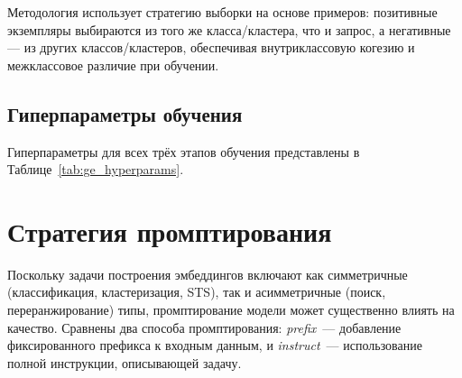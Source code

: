 Методология использует стратегию выборки на основе примеров: позитивные экземпляры выбираются из того же класса/кластера, что и запрос, а негативные --- из других классов/кластеров, обеспечивая внутриклассовую когезию и межклассовое различие при обучении.

\subsection{Гиперпараметры обучения}\label{subsec:ge_hyperparams}

Гиперпараметры для всех трёх этапов обучения представлены в Таблице~\ref{tab:ge_hyperparams}.

\begin{table}[H]
    \centering
    \caption{Гиперпараметры этапов контрастивного предобучения, дообучки на жёстких негативах и мультизадачного обучения.}
    \label{tab:ge_hyperparams}
\end{table}

\section{Стратегия промптирования}\label{sec:ge_prompting}

Поскольку задачи построения эмбеддингов включают как симметричные (классификация, кластеризация, STS), так и асимметричные (поиск, переранжирование) типы, промптирование модели может существенно влиять на качество. Сравнены два способа промптирования: \textit{prefix}~--- добавление фиксированного префикса к входным данным, и \textit{instruct}~--- использование полной инструкции, описывающей задачу.

